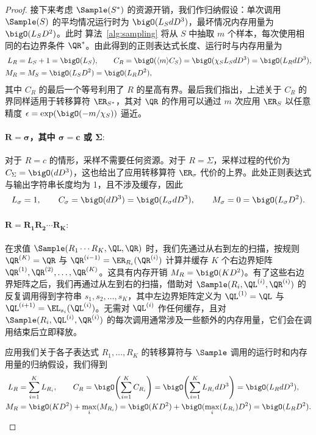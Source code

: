 \begin{proof}
接下来考虑 $\Sample(S^*)$ 的资源开销，我们作归纳假设：单次调用 $\Sample(S)$ 的平均情况运行时为 $\bigO(L_S d D^3)$，最坏情况内存用量为 $\bigO(L_S D^2)$。此时 算法~\ref{alg:sampling} 
将从 $S$ 中抽取 $m$ 个样本，每次使用相同的右边界条件 $\QR^*$。由此得到的正则表达式长度、运行时与内存用量为
%
\begin{align*}
    L_R &= L_S + 1 = \bigO(L_S), \qquad C_R = \bigO(\langle m \rangle C_S) = \bigO(\chi_S L_S d D^3) = \bigO(L_R d D^3), \\
    M_R &= M_S = \bigO(L_S D^2) = \bigO(L_R D^2),
\end{align*}
%
其中 $C_R$ 的最后一个等号利用了 $R$ 的星高有界。最后我们指出，上述关于 $C_R$ 的界同样适用于转移算符 $\ER_{S^*}$，其对 $\QR$ 的作用可以通过 $m$ 次应用 $\ER_S$ 以任意精度 $\epsilon = \exp(\bigO(-m / \chi_S))$ 逼近。

\paragraph{$\mathbf{R = \sigma}$\textbf{，其中 }$\mathbf{\sigma=c}$\textbf{ 或 }$\mathbf{\Sigma:}$} 对于 $R = c$ 的情形，采样不需要任何资源。对于 $R = \Sigma$，采样过程的代价为 $C_\Sigma = \bigO(d D^3)$，这也给出了应用转移算符 $\ER_\sigma$ 代价的上界。此处正则表达式与输出字符串长度均为 1，且不涉及缓存，因此
%
\begin{equation*}
    L_\sigma = 1, \qquad C_\sigma = \bigO(d D^3) = \bigO(L_\sigma d D^3), \qquad M_\sigma = 0 = \bigO(L_\sigma D^2).
\end{equation*}
%
\paragraph{$\mathbf{R = R_1 R_2 \cdots R_K:}$} 在求值 $\Sample(R_1 \cdots R_K, \QL, \QR)$ 时，我们先通过从右到左的扫描，按规则 $\QR^{(K)} = \QR$ 与 $\QR^{(i-1)} = \ER_{R_i}(\QR^{(i)})$ 计算并缓存 $K$ 个右边界矩阵 $\QR^{(1)}, \QR^{(2)}, \ldots, \QR^{(K)}$。这具有内存开销 $M_R = \bigO(K D^2)$。有了这些右边界矩阵之后，我们再通过从左到右的扫描，借助对 $\Sample(R_i, \QL^{(i)}, \QR^{(i)})$ 的反复调用得到字符串 $s_1, s_2, \ldots, s_K$，其中左边界矩阵定义为 $\QL^{(1)} = \QL$ 与 $\QL^{(i+1)} = \EL_{s_i}(\QL^{(i)})$。无需对 $\QL^{(i)}$ 作任何缓存，且对 $\Sample(R_i, \QL^{(i)}, \QR^{(i)})$ 的每次调用通常涉及一些额外的内存用量，它们会在调用结束后立即释放。 

应用我们关于各子表达式 $R_1, \ldots, R_K$ 的转移算符与 $\Sample$ 调用的运行时和内存用量的归纳假设，我们得到
%
\begin{align*}
    L_R &= \sum_{i=1}^K L_{R_i}, \qquad C_R = \bigO\!\left(\sum_{i=1}^K C_{R_i}\right) = \bigO\!\left(\sum_{i=1}^K L_{R_i} d D^3\right) = \bigO(L_R d D^3), \\
    M_R &= \bigO(K D^2) + \max_{i}(M_{R_i}) = \bigO(K D^2) + \bigO(\max_i(L_{R_i})D^2) = \bigO(L_R D^2).
\end{align*}
%

\end{proof}
